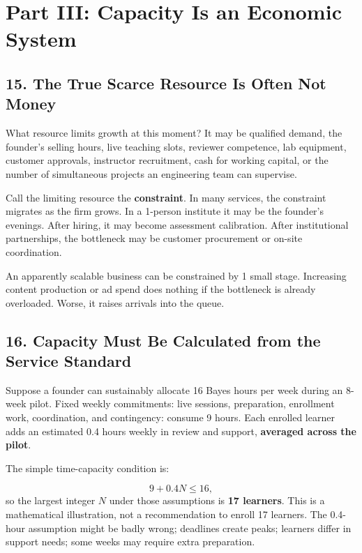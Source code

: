 \section*{Part III: Capacity Is an Economic System}

\subsection*{15. The True Scarce Resource Is Often Not Money}

What resource limits growth at this moment? It may be qualified demand, the founder's selling hours, live teaching slots, reviewer competence, lab equipment, customer approvals, instructor recruitment, cash for working capital, or the number of simultaneous projects an engineering team can supervise.

Call the limiting resource the \textbf{constraint}. In many services, the constraint migrates as the firm grows. In a 1-person institute it may be the founder's evenings. After hiring, it may become assessment calibration. After institutional partnerships, the bottleneck may be customer procurement or on-site coordination.

An apparently scalable business can be constrained by 1 small stage. Increasing content production or ad spend does nothing if the bottleneck is already overloaded. Worse, it raises arrivals into the queue.

\subsection*{16. Capacity Must Be Calculated from the Service Standard}

Suppose a founder can sustainably allocate 16 Bayes hours per week during an 8-week pilot. Fixed weekly commitments: live sessions, preparation, enrollment work, coordination, and contingency: consume 9 hours. Each enrolled learner adds an estimated 0.4 hours weekly in review and support, \textbf{averaged across the pilot}.

The simple time-capacity condition is:

\begin{equation}
9 + 0.4N \le 16,
\end{equation}
so the largest integer $N$ under those assumptions is \textbf{17 learners}. This is a mathematical illustration, not a recommendation to enroll 17 learners. The 0.4-hour assumption might be badly wrong; deadlines create peaks; learners differ in support needs; some weeks may require extra preparation.

